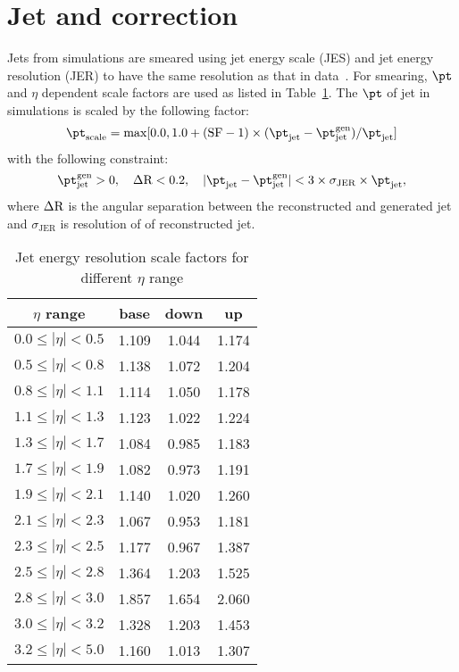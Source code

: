 \section{Jet and \MET correction}
\label{s:JEC}
Jets from simulations are smeared using jet energy scale (JES) and jet energy 
resolution (JER) to have the same resolution as that in data~\cite{Khachatryan:2016kdb}.
For smearing, $\pt$ and $\eta$ dependent scale factors are used as listed 
in Table~\ref{tab:jer_sf}. The $\pt$ of jet in simulations is scaled by the 
following factor:
\begin{equation}
    {\pt}_{\text{scale}} = {\rm {max}}[0.0,1.0+(\rm{SF}-1)\times({\pt}_{\text{jet}}-{\pt}_{\text{jet}}^{\text{gen}})/{\pt}_{\text{jet}}]
\end{equation}
with the following constraint:
\begin{equation}
    {\pt}_{\text{jet}}^{\text{gen}}> 0, \quad \Delta \rm R<0.2, \quad |{\pt}_{\text{jet}}-{\pt}_{\text{jet}}^{\text{gen}} |<
    3\times\sigma_{\rm {JER}}\times{\pt}_{\text{jet}},
\end{equation}
where $\Delta \rm R$ is the angular separation between the reconstructed and 
generated jet and $\sigma_{\text{JER}}$ is resolution of \pt of reconstructed jet. 
\begin{table}
    \caption{Jet energy resolution scale factors for different $\eta$ range}
 \label{tab:jer_sf}
 \begin{center}
 \begin{tabular}{cccc}
     \hline
     \hline
     $\eta$ range & base & down & up \\ 
     \hline
     \hline
     $0.0 \leq | \eta |< 0.5 $ & 1.109 & 1.044 & 1.174 \\
     $0.5 \leq | \eta |< 0.8 $ & 1.138 & 1.072 & 1.204 \\
     $0.8 \leq | \eta |< 1.1 $ & 1.114 & 1.050 & 1.178 \\
     $1.1 \leq | \eta |< 1.3 $ & 1.123 & 1.022 & 1.224 \\
     $1.3 \leq | \eta |< 1.7 $ & 1.084 & 0.985 & 1.183 \\
     $1.7 \leq | \eta |< 1.9 $ & 1.082 & 0.973 & 1.191 \\
     $1.9 \leq | \eta |< 2.1 $ & 1.140 & 1.020 & 1.260 \\
     $2.1 \leq | \eta |< 2.3 $ & 1.067 & 0.953 & 1.181 \\
     $2.3 \leq | \eta |< 2.5 $ & 1.177 & 0.967 & 1.387 \\
     $2.5 \leq | \eta |< 2.8 $ & 1.364 & 1.203 & 1.525 \\
     $2.8 \leq | \eta |< 3.0 $ & 1.857 & 1.654 & 2.060 \\
     $3.0 \leq | \eta |< 3.2 $ & 1.328 & 1.203 & 1.453 \\
     $3.2 \leq | \eta |< 5.0 $ & 1.160 & 1.013 & 1.307 \\ \hline
 \end{tabular}
 \end{center}
 \end{table}

